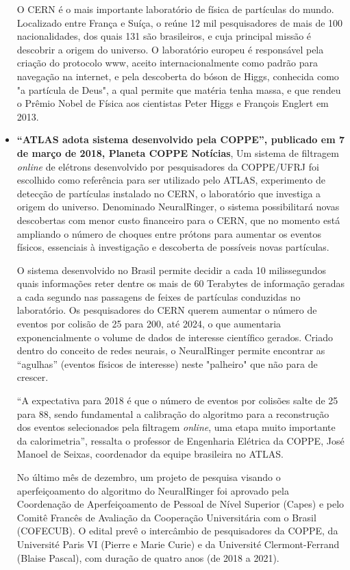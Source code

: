 \begin{itemize}
    O CERN é o mais importante laboratório de física de partículas do mundo. Localizado 
    entre França e Suíça, o reúne 12 mil pesquisadores de mais de 100 nacionalidades, 
    dos quais 131 são brasileiros, e cuja principal missão é descobrir a origem do 
    universo. O laboratório europeu é responsável pela criação do protocolo www, aceito 
    internacionalmente como padrão para navegação na internet, e pela descoberta do 
    bóson de Higgs, conhecida como "a partícula de Deus", a qual permite que matéria 
    tenha massa, e que rendeu o Prêmio Nobel de Física aos cientistas Peter Higgs e 
    François Englert em 2013.

    \item \textbf{``ATLAS adota sistema desenvolvido pela COPPE'', publicado em 7 de março de 2018,
    Planeta COPPE Notícias}, Um sistema de filtragem \emph{online} de elétrons desenvolvido por pesquisadores 
    da COPPE/UFRJ foi escolhido como referência para ser utilizado pelo 
    ATLAS, experimento de detecção de partículas instalado no CERN, o laboratório 
    que investiga a origem do universo. Denominado NeuralRinger, o sistema 
    possibilitará novas descobertas com menor custo financeiro para o CERN, que 
    no momento está ampliando o número de choques entre prótons para aumentar 
    os eventos físicos, essenciais à investigação e descoberta de possíveis 
    novas partículas.

    O sistema desenvolvido no Brasil permite decidir a cada 10 milissegundos 
    quais informações reter dentre os mais de 60 Terabytes de informação geradas 
    a cada segundo nas passagens de feixes de partículas conduzidas no laboratório. 
    Os pesquisadores do CERN querem aumentar o número de eventos por colisão de 25 
    para 200, até 2024, o que aumentaria exponencialmente o volume de dados de 
    interesse científico gerados. Criado dentro do conceito de redes neurais, 
    o NeuralRinger permite encontrar as ``agulhas'' (eventos físicos de interesse) 
    neste "palheiro" que não para de crescer.

    ``A expectativa para 2018 é que o número de eventos por colisões salte de 
    25 para 88, sendo fundamental a calibração do algoritmo para a reconstrução 
    dos eventos selecionados pela filtragem \emph{online}, uma etapa muito importante 
    da calorimetria'', ressalta o professor de Engenharia Elétrica da COPPE, 
    José Manoel de Seixas, coordenador da equipe brasileira no ATLAS.
    
    No último mês de dezembro, um projeto de pesquisa visando o aperfeiçoamento 
    do algoritmo do NeuralRinger foi aprovado pela Coordenação de Aperfeiçoamento 
    de Pessoal de Nível Superior (Capes) e pelo Comitê Francês de Avaliação da 
    Cooperação Universitária com o Brasil (COFECUB). O edital prevê o intercâmbio 
    de pesquisadores da COPPE, da Université Paris VI (Pierre e Marie Curie) e 
    da Université Clermont-Ferrand (Blaise Pascal), com duração de quatro anos 
    (de 2018 a 2021). 
    

\end{itemize}
